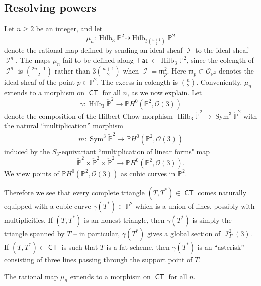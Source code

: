 \documentclass{article}
\renewcommand{\P}{\mathbb{P}}
\DeclareMathOperator{\Hilb}{Hilb}
\DeclareMathOperator{\I}{\mathcal{I}}
\renewcommand{\O}{\mathcal{O}}
\DeclareMathOperator{\CT}{\mathsf{CT}}
\newcommand{\from}{\colon}
\DeclareMathOperator{\Fat}{\mathsf{Fat}}
\DeclareMathOperator{\Sym}{Sym}
\begin{document}
\subsection{Resolving powers} %
\label{sub:nthpowermaps}
Let $n \geq 2$ be an integer, and let
\[\mu_{n} \from \Hilb_{3}\P^{2} \dashrightarrow \Hilb_{3 {n+1 \choose
      2}}\P^{2}\] denote the rational map defined by sending an ideal
sheaf $\I$ to the ideal sheaf $\I^{n}$. The maps $\mu_{n}$ fail to be
defined along $\Fat \subset \Hilb_{3}\P^{2}$, since the colength of
$\I^{n}$ is ${2n+1 \choose 2}$ rather than $3 {n+1 \choose 2}$ when
$\I = \mathfrak{m}_{p}^{2}$. Here $\mathfrak{m}_{p} \subset \O_{\P^{2}}$
denotes the ideal sheaf of the point $p \in \P^{2}$. The excess in
colength is ${n \choose 2}$.  Conveniently, $\mu_{n}$ extends to a
morphism on $\CT$ for all $n$, as we now explain. Let
$$\gamma \from \Hilb_{3}\check{\P}^{2} \to \P H^{0}(\P^{2}, \O(3))$$ denote
the composition of the Hilbert-Chow morphism
$\Hilb_{3}\check{\P}^{2} \to \Sym^{3}\check{\P}^{2}$ with the natural
``multiplication'' morphism
\begin{eqnarray*}
  m \from \Sym^{3}\check{\P}^{2} \to \P H^{0}(\P^{2}, \O(3))
 \end{eqnarray*}
 induced by the $S_{3}$-equivariant ``multiplication of linear forms"
 map
 $$\check{\P}^{2} \times \check{\P}^{2} \times \check{\P}^{2} \to \P H^{0}(\P^{2}, \O(3)).$$
 We view points of $\P H^{0}(\P^{2}, \O(3))$ as cubic curves in
 $\P^{2}$.

 Therefore we see that every complete triangle $(T, T^{*}) \in \CT$ comes
 naturally equipped with a cubic curve $\gamma(T^{*}) \subset \P^{2}$
 which is a union of lines, possibly with multiplicities. If
 $(T, T^{*})$ is an honest triangle, then $\gamma(T^{*})$ is simply
 the triangle spanned by $T$ -- in particular, $\gamma(T^{*})$ gives a
 global section of $\I_{\Gamma}^{2}(3)$. If
 $(T, T^{*}) \in \CT$ is such that $T$ is a fat scheme,
 then $\gamma(T^{*})$ is an ``asterisk'' consisting of three lines
 passing through the support point of $T$.


\begin{theorem}
  \label{thm:resolventhpower}
  The rational map $\mu_{n}$ extends to a morphism on $\CT$ for all
  $n$.
\end{theorem}
\end{document}
